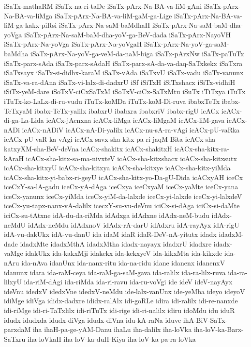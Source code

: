 {iSaTx-mathaRM
iSaTx-na-ri-taDe
iSaTx-pArx-Na-BA-va-liM-gAni
iSaTx-pArx-Na-BA-va-liMga
iSaTx-pArx-Na-BA-va-liM-gaM-ga-Lige
iSaTx-pArx-Na-BA-va-liM-ga-kakx-piRsi
iSaTx-pArx-Na-saM-baMdhaH
iSaTx-pArx-Na-saM-baM-dha-yoVga
iSaTx-pArx-Na-saM-baM-dha-yoV-ga-BeV-dada
iSaTx-pArx-NayoVH
iSaTx-pArx-Na-yoVga
iSaTx-pArx-Na-yoVgaH
iSaTx-pArx-Na-yoV-ga-saM-baMdha
iSaTx-pArx-Na-yoV-ga-veM-da-naM-biga
iSaTx-pArxNw
iSaTx-paTuTx
iSaTx-parx-sAda
iSaTx-parx-sAdaH
iSaTx-parx-sA-da-va-daq-SaTxkekx
iSaTxra
iSaTxsayx
iSaTx-si-didhx-karaM
iSaTx-vAda
iSaTxvU
iSaTx-vadu
iSaTx-vanunx
iSaTx-va-ra-dAna
iSaTx-vi-lalx-di-dadxrU
iSf
iSiTxH
iSiTxshacx
iSiTx-vidhiH
iSiTx-yeM-dare
iSoTxV-ciCxSaTxM
iSoTxV-ciCx-SaTxMtu
iSuTx
iTiTxya
iTuTx
iTuTx-ko-LaLx-di-ru-vudu
iTuTx-koMDa
iTuTx-koM-Di-ruva
ibabxTeTx
ibabx-TeTxyaM
ibabx-TeTx-yalilx
ibabxrU
ibabxra
ibabxriV
ibabx-rigU
icACx
icACx-di-ga-La-Lida
icACx-jAcnxna
icACx-liMga
icACx-liMgaM
icACx-liM-gava
icACx-nADi
icACx-nADiV
icACx-nA-Di-yalilx
icACx-nu-sA-ra-vAgi
icACx-pU-vaRka
icACx-pU-vaR-ka-vAgi
icACx-savx-sha-kitx-pa-ri-jaqM-Bita
icACx-sha-katxyXM-sha-BeV-deVna
icACx-shakitx
icACx-shakitxH
icACx-sha-kitx-ra-kAraH
icACx-sha-kitx-sa-ma-nivxteV
icACx-sha-kitxshacx
icACx-sha-kitxsutx
icACx-sha-kitxyU
icACx-sha-kitxya
icACx-sha-kitxye
icACx-sha-kitx-yiMda
icACx-sha-kitx-yi-babx-ri-geyU
icACx-sha-kitx-yo-Da-gU-Dida
icACxyAH
iceCx
iceCxY-sa-lA-gadu
iceCx-yA-dAga
iceCxya
iceCxyaM
iceCx-yaMte
iceCx-yana
iceCx-yanunx
iceCx-yiMda
iceCx-yiM-da-lalxde
iceCx-yi-lalxde
iceCx-yi-lalxdeV
iceCx-yu-tapx-nanx-vA-dalilx
icecxY-su-vu-deVnu
iciCx-si-dAga
iciCx-si-daMte
iciCx-su-tAtxne
idA-du-da-riMda
idAdxga
idAdxne
idAdx-neM-budu
idAdx-neMdU
idAdx-neMdu
idAdxnoV
idAdx-rA-darU
idAdxru
idA-rayAyx
idA-rigU
idA-vu-dakUkx
idA-vu-danU
ida
idaM
idaR
idaR-DeV-nA-yitutx
idadx
idadxM-dade
idadxMte
idadxMthA
idadxMtha
idadx-nayayx
idadxrU
idadxre
idadx-vaMge
idakUkx
ida-kakxMji
idakekx
ida-kekxyeV
ida-kikxMta
ida-kikxde
ida-nAru
ida-nAva
idanUnx
ida-nanx-ritu
ida-na-ridu
idane
idanenx
idanenxV
idanunx
idara
ida-raM-ceya
ida-raM-ga-saM-gava
ida-ralilx
ida-ra-lilx-ruva
ida-ra-lilxyU
ida-riM-dAgi
ida-riMda
ida-ri-ravu
ida-ru-voVgi
ide
ideV
ideV-nayAyx
ideVnu
idedxV
idedxVne
idedxV-neMdu
ide-lalx-vanUnx
ide-yeMba
ideyo
ideyoV
idiMge
idiVga
ididx-dadxre
ididx-ralAlx
idi-goRLe
idira
idi-ralilx
idi-re-nanxde
idi-riMge
idi-ri-TaTxlilx
idi-riTuTx
idi-rige
idi-ri-nalilx
idiru
idoMdu
idu
iduR
idudx
idudxda
idudx-diVga
idudx-diVna
idu-kA-raNa
iduve
ihA-BiV-SaTx-parxdaM
iha
ihaH-pa-ge-yAM-Danu
ihaLu
iha-dalilx
iha-loVka
iha-loV-ka-Barx-SaTxru
iha-loVkaH
iha-loV-ka-duH-Kiya
iha-loV-ka-pa-ra-loVka
}
